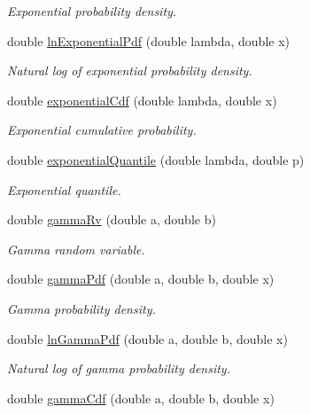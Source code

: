 \begin{DoxyCompactItemize}
\begin{DoxyCompactList}\small\item\em Exponential probability density. \end{DoxyCompactList}\item 
double \mbox{\hyperlink{class_mb_random_a3438c95566d2a0ddbc1b252a8a4197c3}{ln\+Exponential\+Pdf}} (double lambda, double x)
\begin{DoxyCompactList}\small\item\em Natural log of exponential probability density. \end{DoxyCompactList}\item 
double \mbox{\hyperlink{class_mb_random_a700869de26a58dd792f31f13fcf2331d}{exponential\+Cdf}} (double lambda, double x)
\begin{DoxyCompactList}\small\item\em Exponential cumulative probability. \end{DoxyCompactList}\item 
double \mbox{\hyperlink{class_mb_random_a329f440ae9e26adca8cbdd42acd2d480}{exponential\+Quantile}} (double lambda, double p)
\begin{DoxyCompactList}\small\item\em Exponential quantile. \end{DoxyCompactList}\item 
double \mbox{\hyperlink{class_mb_random_ac5f030bb3dab8a93bd3430e8b9319d88}{gamma\+Rv}} (double a, double b)
\begin{DoxyCompactList}\small\item\em Gamma random variable. \end{DoxyCompactList}\item 
double \mbox{\hyperlink{class_mb_random_a38890666f1288b6d06df22508ff9b2ec}{gamma\+Pdf}} (double a, double b, double x)
\begin{DoxyCompactList}\small\item\em Gamma probability density. \end{DoxyCompactList}\item 
double \mbox{\hyperlink{class_mb_random_aa48ff75522fc4c5426af0133753ce19e}{ln\+Gamma\+Pdf}} (double a, double b, double x)
\begin{DoxyCompactList}\small\item\em Natural log of gamma probability density. \end{DoxyCompactList}\item 
double \mbox{\hyperlink{class_mb_random_a623acd4af1a73f29ee4f7cc603a38231}{gamma\+Cdf}} (double a, double b, double x)

\end{DoxyCompactItemize}
